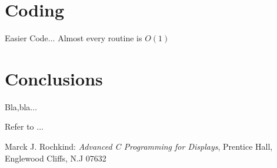 \documentclass[a4paper,twoside,draft]{article}
\begin{document}
\section{Coding}
\label{sec:code}
Easier Code... Almost every routine is \(O(1)\)
\section{Conclusions}
\label{sec:conc}

Bla,bla...
\newpage

\label{sec:curses}

Refer to ...




\begin{thebibliography}{}
 Marck J. Rochkind:
  \emph{Advanced C Programming for Displays},
  Prentice Hall, Englewood Cliffs, N.J 07632
\end{thebibliography}
\end{document}
